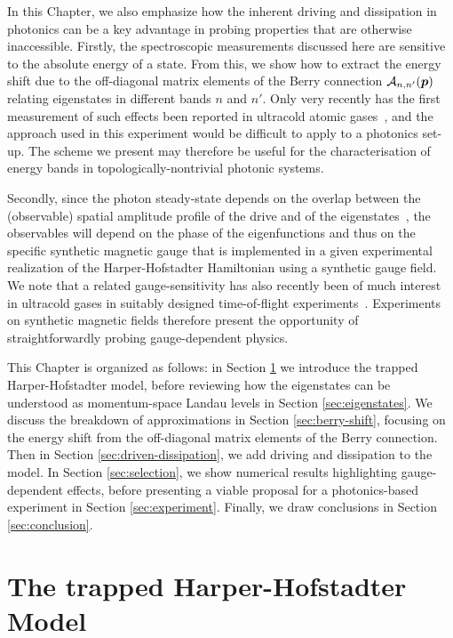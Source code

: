 In this Chapter, we also emphasize how the inherent driving and
dissipation in photonics can be a key advantage in probing properties
that are otherwise inaccessible.  Firstly, the spectroscopic
measurements discussed here are sensitive to the absolute energy of a
state. From this, we show how to extract the energy shift due to the
off-diagonal matrix elements of the Berry connection
$\mathcal{A}_{n,n'}(\bm{p})$ relating eigenstates in different bands $n$
and $n'$. Only very recently has the first measurement of such effects
been reported in ultracold atomic
gases~\cite{Grusdt2014nonabelian,tracy2015arxiv}, and the approach
used in this experiment would be difficult to apply to a photonics
set-up. The scheme we present may therefore be useful for the
characterisation of energy bands in topologically-nontrivial photonic
systems.

Secondly, since the photon steady-state depends on the overlap between
the (observable) spatial amplitude profile of the drive and of the
eigenstates~\cite{carusotto2013fluids}, the observables will depend on
the phase of the eigenfunctions and thus on the specific synthetic
magnetic gauge that is implemented in a given experimental realization
of the Harper-Hofstadter Hamiltonian using a synthetic gauge field. We
note that a related gauge-sensitivity has also recently been of much
interest in ultracold gases in suitably designed time-of-flight
experiments~\cite{kennedy2015bec,spielman2011gauge, spielman_gauge,
tomoki2015nv}. Experiments on synthetic magnetic fields therefore
present the opportunity of straightforwardly probing gauge-dependent
physics.

This Chapter is organized as follows: in Section \ref{sec:model} we
introduce the trapped Harper-Hofstadter model, before reviewing how
the eigenstates can be understood as momentum-space Landau levels in
Section \ref{sec:eigenstates}. We discuss the breakdown of
approximations in Section \ref{sec:berry-shift}, focusing on the
energy shift from the off-diagonal matrix elements of the Berry
connection. Then in Section \ref{sec:driven-dissipation}, we add
driving and dissipation to the model. In Section \ref{sec:selection},
we show numerical results highlighting gauge-dependent effects, before
presenting a viable proposal for a photonics-based experiment in
Section \ref{sec:experiment}. Finally, we draw conclusions in Section
\ref{sec:conclusion}.


\section{The trapped Harper-Hofstadter Model}
\label{sec:model}

